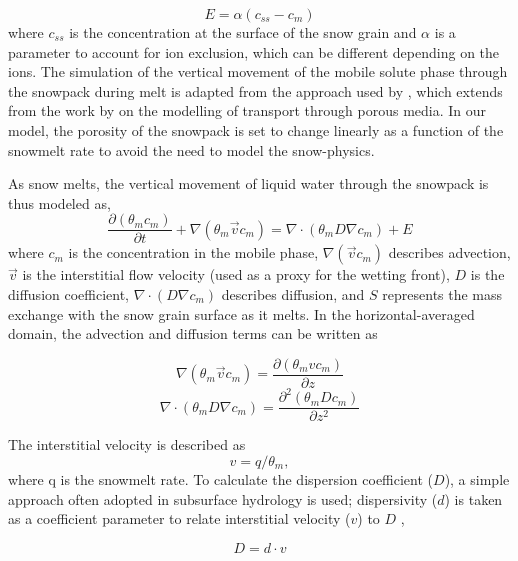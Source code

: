 \documentclass[authoryear,preprint,review,12pt]{elsarticle}
\begin{document}
\begin{equation}
	E = \alpha (c_{ss}-c_m)
	\label{eq:exchangesnowcoretosurface}
\end{equation}
\noindent where $c_{ss}$ is the concentration at the surface of the snow grain and $\alpha$ is a parameter to account for ion exclusion, which can be different depending on the ions. The simulation of the vertical movement of the mobile solute phase through the snowpack during melt is adapted from the approach used by \citet{Harrington1998}, which extends from the work by \citet{Bear1990} on the modelling of transport through porous media. In our model, the porosity of the snowpack is set to change linearly as a function of the snowmelt rate to avoid the need to model the snow-physics.\par


As snow melts, the vertical movement of liquid water through the snowpack is thus modeled as, 
\begin{equation}
\dfrac{\partial (\theta_m c_m)}{\partial t} + \nabla( \theta_m \vec{v} c_m) = \nabla \cdot (\theta_m D \nabla c_m) + E
\end{equation}
where $c_m$ is the concentration in the mobile phase, $\nabla( \vec{v} c_m)$ describes advection, $\vec{v}$ is the interstitial flow velocity (used as a proxy for the wetting front), $D$ is the diffusion coefficient, $\nabla \cdot (D \nabla c_m)$ describes diffusion, and $S$ represents the mass exchange with the snow grain surface as it melts. In the horizontal-averaged domain, the advection and diffusion terms can be written as

\begin{equation}
\nabla( \theta_m \vec{v} c_m) = \dfrac{\partial ( \theta_m v c_m) }{\partial z}
\end{equation}
\begin{equation}
\nabla \cdot (\theta_m D \nabla c_m) = \dfrac{\partial^2 (\theta_m D c_m)}{\partial z^2}
\end{equation}

The interstitial velocity is described as
\begin{equation}
v = q / \theta_m, 
\end{equation}
\noindent where q is the snowmelt rate. To calculate the dispersion coefficient ($D$), a simple approach often adopted in subsurface hydrology is used; dispersivity ($d$) is taken as a coefficient parameter to relate interstitial velocity ($v$) to $D$ \citep{Charbeneau1992},

\begin{equation}
D = d \cdot v
\end{equation}
\end{document}
